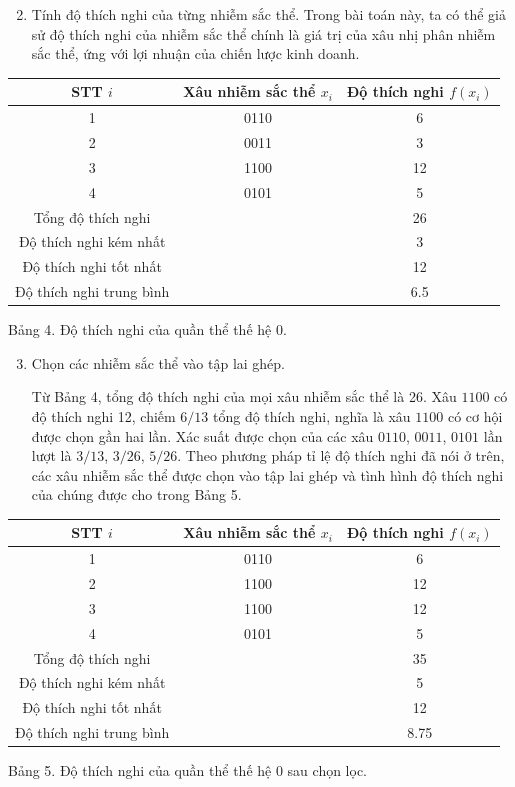 \documentclass[11pt]{article}
\begin{document}
\begin{enumerate}
  \setcounter{enumi}{1}
  \item Tính độ thích nghi của từng nhiễm sắc thể. Trong bài toán này, ta có
  thể giả sử độ thích nghi của nhiễm sắc thể chính là giá trị của xâu nhị
  phân nhiễm sắc thể, ứng với lợi nhuận của chiến lược kinh doanh.
\end{enumerate}

\begin{center}
\begin{tabular}{c|cc}
STT \(i\) & Xâu nhiễm sắc thể \(x_i\) & Độ thích nghi \(f(x_i)\)\\ \hline
1 & 0110 & 6\\
2 & 0011 & 3\\
3 & 1100 & 12\\
4 & 0101 & 5\\ \hline
Tổng độ thích nghi & & 26\\
Độ thích nghi kém nhất & & 3\\
Độ thích nghi tốt nhất & & 12\\
Độ thích nghi trung bình & & 6.5
\end{tabular}

Bảng 4. Độ thích nghi của quần thể thế hệ 0.
\end{center}

\begin{enumerate}
  \setcounter{enumi}{2}
  \item Chọn các nhiễm sắc thể vào tập lai ghép.

  Từ Bảng 4, tổng độ thích nghi của mọi xâu nhiễm sắc thể là 26. Xâu
  \(1100\) có độ thích nghi 12, chiếm \(6/13\) tổng độ thích nghi, nghĩa là
  xâu \(1100\) có cơ hội được chọn gần hai lần. Xác suất được chọn của các
  xâu \(0110\), \(0011\), \(0101\) lần lượt là \(3/13\), \(3/26\), \(5/26\).
  Theo phương pháp tỉ lệ độ thích nghi đã nói ở trên, các xâu nhiễm sắc thể
  được chọn vào tập lai ghép và tình hình độ thích nghi của chúng được cho
  trong Bảng 5.
\end{enumerate}

\begin{center}
\begin{tabular}{c|cc}
STT \(i\) & Xâu nhiễm sắc thể \(x_i\) & Độ thích nghi \(f(x_i)\)\\ \hline
1 & 0110 & 6\\
2 & 1100 & 12\\
3 & 1100 & 12\\
4 & 0101 & 5\\ \hline
Tổng độ thích nghi & & 35\\
Độ thích nghi kém nhất & & 5\\
Độ thích nghi tốt nhất & & 12\\
Độ thích nghi trung bình & & 8.75
\end{tabular}

Bảng 5. Độ thích nghi của quần thể thế hệ 0 sau chọn lọc.
\end{center}
\end{document}

